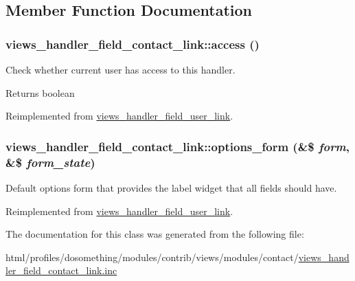 \subsection{Member Function Documentation}
\hypertarget{classviews__handler__field__contact__link_a5785d1771c75ad924557c3df87d6288b}{
\subsubsection[{access}]{\setlength{\rightskip}{0pt plus 5cm}views\_\-handler\_\-field\_\-contact\_\-link::access ()}}
\label{classviews__handler__field__contact__link_a5785d1771c75ad924557c3df87d6288b}
Check whether current user has access to this handler.

\begin{DoxyReturn}{Returns}
boolean 
\end{DoxyReturn}


Reimplemented from \hyperlink{classviews__handler__field__user__link_a00708207b597556c70cba91816a03963}{views\_\-handler\_\-field\_\-user\_\-link}.\hypertarget{classviews__handler__field__contact__link_ad6709f7a6f48dc51fe3952f26598e622}{
\subsubsection[{options\_\-form}]{\setlength{\rightskip}{0pt plus 5cm}views\_\-handler\_\-field\_\-contact\_\-link::options\_\-form (\&\$ {\em form}, \/  \&\$ {\em form\_\-state})}}
\label{classviews__handler__field__contact__link_ad6709f7a6f48dc51fe3952f26598e622}
Default options form that provides the label widget that all fields should have. 

Reimplemented from \hyperlink{classviews__handler__field__user__link_a952944015feaaab1fb2d0abc29d5c2b5}{views\_\-handler\_\-field\_\-user\_\-link}.

The documentation for this class was generated from the following file:\begin{DoxyCompactItemize}
\item 
html/profiles/dosomething/modules/contrib/views/modules/contact/\hyperlink{views__handler__field__contact__link_8inc}{views\_\-handler\_\-field\_\-contact\_\-link.inc}\end{DoxyCompactItemize}
